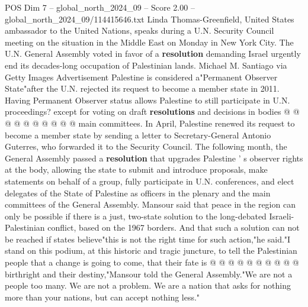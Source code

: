 \begin{textsample}{POS Dim 7 – global\_north\_2024\_09 – Score 2.00 – global\_north\_2024\_09/114415646.txt}
Linda Thomas-Greenfield, United States ambassador to the United Nations, speaks during a U.N.
Security Council meeting on the situation in the Middle East on Monday in New York City.
The U.N.
General Assembly voted in favor of a \textbf{resolution} demanding Israel urgently end its decades-long occupation of Palestinian lands.
Michael M.
Santiago via Getty Images Advertisement Palestine is considered a"Permanent Observer State"after the U.N. rejected its request to become a member state in 2011.
Having Permanent Observer status allows Palestine to still participate in U.N. proceedings? except for voting on draft \textbf{resolutions} and decisions in bodies @ @ @ @ @ @ @ @ @ @ main committees.
In April, Palestine renewed its request to become a member state by sending a letter to Secretary-General Antonio Guterres, who forwarded it to the Security Council.
The following month, the General Assembly passed a \textbf{resolution} that upgrades Palestine ' s observer rights at the body, allowing the state to submit and introduce proposals, make statements on behalf of a group, fully participate in U.N. conferences, and elect delegates of the State of Palestine as officers in the plenary and the main committees of the General Assembly.
Mansour said that peace in the region can only be possible if there is a just, two-state solution to the long-debated Israeli-Palestinian conflict, based on the 1967 borders.
And that such a solution can not be reached if states believe"this is not the right time for such action,"he said."I stand on this podium, at this historic and tragic juncture, to tell the Palestinian people that a change is going to come, that their fate is @ @ @ @ @ @ @ @ @ @ birthright and their destiny,"Mansour told the General Assembly."We are not a people too many.
We are not a problem.
We are a nation that asks for nothing more than your nations, but can accept nothing less."

\end{textsample}
